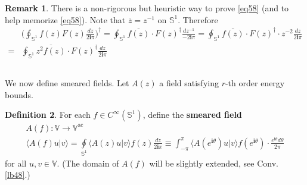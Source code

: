 \documentclass[12pt,b5paper,notitlepage]{article}
\theoremstyle{definition}
\newtheorem{df}{Definition}[section]
\newtheorem{rem}[df]{Remark}
\theoremstyle{plain}
\newcommand{\ovl}{\overline}
\newcommand{\bk}[1]{\langle {#1}\rangle}
\newcommand{\im}{\mathbf{i}}
\newcommand{\Vbb}{\mathbb V}
\newcommand{\Sbb}{{\mathbb S}}
\newcommand{\ac}{\mathrm{ac}}
\numberwithin{equation}{section}
\begin{document}
\begin{rem}
There is a non-rigorous but heuristic way to prove \eqref{eq58} (and to help memorize \eqref{eq58}). Note that $\ovl z=z^{-1}$ on $\Sbb^1$. Therefore
\begin{align*}
&\bigg(\oint\nolimits_{\Sbb^1}f(z)F(z)\frac{dz}{2\im\pi}\bigg)^\dagger=\oint\nolimits_{\Sbb^1}\ovl{f(z)}\cdot F(z)^\dagger \frac{d{z^{-1}}}{-2\im\pi}=\oint\nolimits_{\Sbb^1}\ovl{f(z)}\cdot F(z)^\dagger\cdot z^{-2}\frac{dz}{2\im\pi}\\
=&\oint\nolimits_{\Sbb^1}\ovl{z^2f(z)}\cdot F(z)^\dagger\frac{dz}{2\im\pi}
\end{align*}
\end{rem}


\subsection{}

We now define smeared fields. Let $A(z)$ a field satisfying $r$-th order energy bounds.

\begin{df}\label{lb38}
For each $f\in C^\infty(\Sbb^1)$, define the \textbf{smeared field} 
\begin{gather*}
A(f):\Vbb\rightarrow\Vbb^\ac\\
\bk{A(f)u|v}=\oint\limits_{\Sbb^1} \bk{A(z)u|v}f(z)\frac{dz}{2\im\pi}\equiv \int_{-\pi}^\pi \bk{A(e^{\im \theta})u|v}f(e^{\im \theta})\cdot \frac{e^{\im\theta}d\theta}{2\pi}
\end{gather*} 
for all $u,v\in\Vbb$. (The domain of $A(f)$ will be slightly extended, see Conv. \ref{lb48}.)
\end{df}
\end{document}

